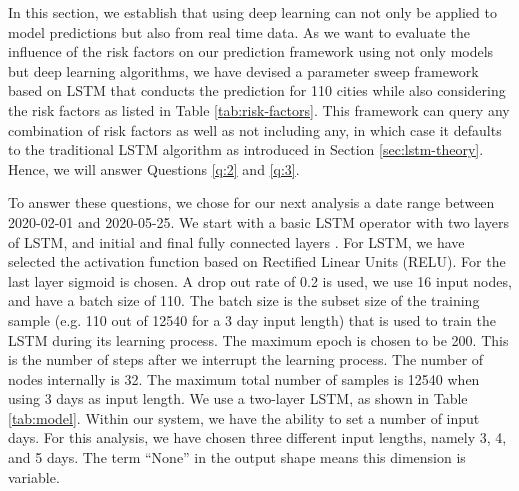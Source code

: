 \documentclass[a4paper, inpress]{jds} %
\renewcommand{\_}{%
    \textunderscore\hspace{0pt}%
}
\begin{document}
In this section, we establish that using deep learning can not only be
applied to model predictions but also from real time data. As we want
to evaluate the influence of the risk factors on our prediction
framework using not only models but deep learning algorithms, we have
devised a parameter sweep framework based on LSTM that conducts the
prediction for 110 cities while also considering the risk factors as
listed in Table \ref{tab:risk-factors}. This framework can query any
combination of risk factors as well as not including any, in which
case it defaults to the traditional LSTM algorithm as introduced in
Section \ref{sec:lstm-theory}. Hence, we will answer Questions
\ref{q:2} and \ref{q:3}.

To answer these questions, we chose for our next analysis a date range
between 2020-02-01 and 2020-05-25. We start with a basic LSTM operator
with two layers of LSTM, and initial and final fully connected layers
\citep{Kadupitiya2020-zq}.  For LSTM, we have selected the activation
function based on Rectified Linear Units (RELU). For the last layer
sigmoid is chosen. A drop out rate of 0.2 is used, we use 16 input
nodes, and have a batch size of 110. The batch size is the subset size
of the training sample (e.g. 110 out of 12540 for a 3 day input
length) that is used to train the LSTM during its learning
process. The maximum epoch is chosen to be 200. This is the number of
steps after we interrupt the learning process. The number of nodes
internally is 32. The maximum total number of samples is 12540 when
using 3 days as input length. We use a two-layer LSTM, as shown in
Table \ref{tab:model}. Within our system, we have the ability to set a
number of input days. For this analysis, we have chosen three
different input lengths, namely 3, 4, and 5 days. The term ``None'' in
the output shape means this dimension is variable.
\end{document}
